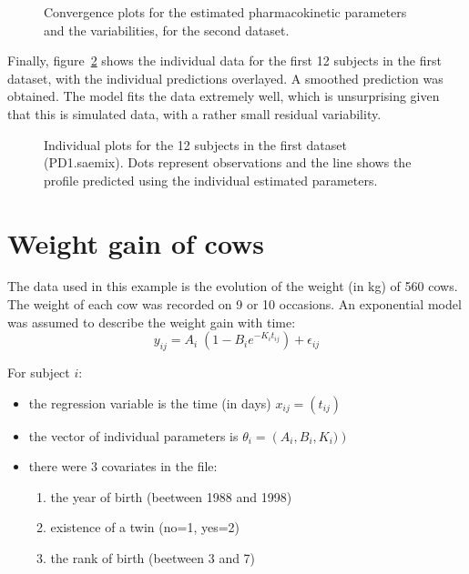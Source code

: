 {\clearpage
\begin{figure}[!h]
\begin{center}
\par \kern -1cm
\end{center}
\par \kern -0.5cm
\caption{Convergence plots for the estimated pharmacokinetic parameters and the variabilities, for the second dataset.} \label{fig:convergPD2}
\end{figure}

\bigskip
Finally, figure~\ref{fig:PDindividual} shows the individual data for the first 12 subjects in the first dataset, with the individual predictions overlayed. A smoothed prediction was obtained. The model fits the data extremely well, which is unsurprising given that this is simulated data, with a rather small residual variability.

\begin{figure}[!h]
\begin{center}
\par \kern -1cm
\end{center}
\par \kern -0.5cm
\caption{Individual plots for the 12 subjects in the first dataset ({\sf PD1.saemix}). Dots represent observations and the line shows the profile predicted using the individual estimated parameters.} \label{fig:PDindividual}
\end{figure}

\clearpage
\newpage


\section{Weight gain of cows} \label{sec:examplecow}

The data used in this example is the evolution of the weight (in kg) of 560 cows. The weight of each cow was recorded on 9 or 10 occasions. An exponential model was assumed to describe the weight gain with time:
\begin{equation}
y_{ij} = A_{i} \; \left( 1- B_i e^{-K_i t_{ij}} \right) + \epsilon_{ij}
\end{equation}

For subject $i$:
\begin{itemize}
\item the regression variable is the time (in days) $x_{ij} = (t_{ij})$
\item the vector of individual parameters is $\theta_i = \left(A_i, B_i, K_i) \right)$
\item there were 3 covariates in the file:
   \begin{enumerate}
   \item the year of birth (beetween 1988 and 1998)
   \item existence of a twin (no=1, yes=2)
   \item the rank of birth (beetween 3 and 7)
   \end{enumerate}
\end{itemize}

}
